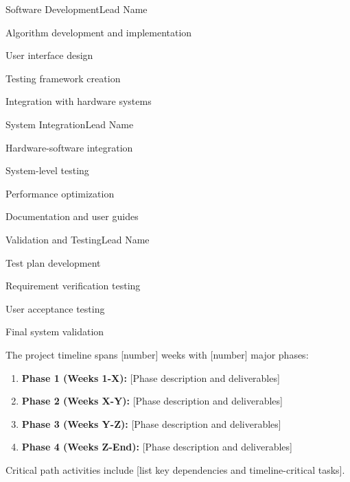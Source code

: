 \documentclass[final]{../designreport}
\begin{document}
\begin{subproject}{Software Development}{Lead Name}
    \item Algorithm development and implementation
    \item User interface design
    \item Testing framework creation
    \item Integration with hardware systems
\end{subproject}

\begin{subproject}{System Integration}{Lead Name}
    \item Hardware-software integration
    \item System-level testing
    \item Performance optimization
    \item Documentation and user guides
\end{subproject}

\begin{subproject}{Validation and Testing}{Lead Name}
    \item Test plan development
    \item Requirement verification testing
    \item User acceptance testing
    \item Final system validation
\end{subproject}


The project timeline spans [number] weeks with [number] major phases:

\begin{enumerate}
    \item \textbf{Phase 1 (Weeks 1-X):} [Phase description and deliverables]
    \item \textbf{Phase 2 (Weeks X-Y):} [Phase description and deliverables]
    \item \textbf{Phase 3 (Weeks Y-Z):} [Phase description and deliverables]
    \item \textbf{Phase 4 (Weeks Z-End):} [Phase description and deliverables]
\end{enumerate}

Critical path activities include [list key dependencies and timeline-critical tasks].

\costanalysis
\end{document}
